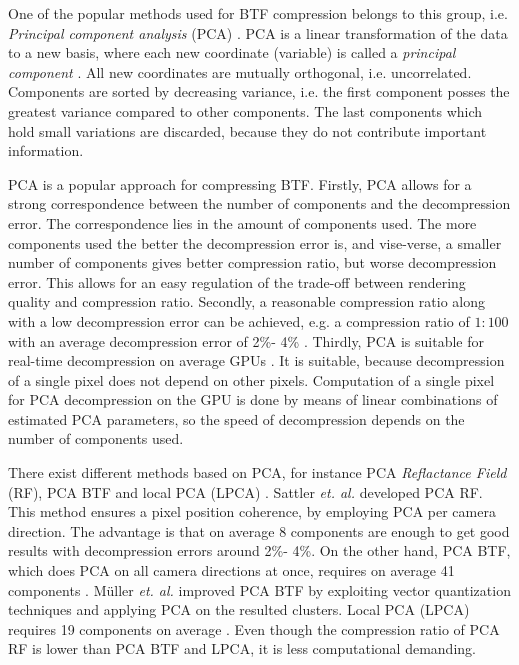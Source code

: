 One of the popular methods used for BTF compression belongs to this group, i.e. \emph{Principal component analysis} (PCA) \cite{Bishop,schneider2004,haindl,webglbtfstreaming,sattler-2003-efficient,mueller-2003-compression,gpu_gems}.
PCA is a linear transformation of the data to a new basis, where each new coordinate (variable) is called a \emph{principal component} \cite{Bishop}.
All new coordinates are mutually orthogonal, i.e. uncorrelated. Components are sorted by decreasing variance, i.e. the first component posses the greatest variance compared to other components. 
 The last components which hold small variations are discarded, because they do not contribute important information.

PCA is a popular approach for compressing BTF. 
Firstly, PCA allows for a strong correspondence between the number of components and the decompression error.
 The correspondence lies in the amount of components used.
 The more components used the better the decompression error is, and vise-verse, a smaller number of components gives better compression ratio, but worse decompression error.
 This allows for an easy  regulation of the trade-off between rendering quality and  compression ratio.
Secondly, a reasonable compression ratio along with a low decompression error can be achieved, e.g. a compression ratio of $1:100$ with an average decompression error of 2\%- 4\% \cite{schneider2004,haindl}.
Thirdly, PCA is suitable for real-time decompression on average GPUs \cite{schneider2004,haindl}. 
It is suitable, because decompression of a single pixel does not depend on other pixels.
 Computation of a single pixel for PCA decompression on the GPU is done by means of linear combinations of estimated PCA parameters, so the speed of decompression depends on the number of components used.
 
 There exist different methods based on PCA, for instance PCA \emph{Reflactance Field} (RF), PCA BTF and local PCA (LPCA) \cite{sattler-2003-efficient,schneider2004,mueller-2003-compression, haindl}.
 Sattler \emph{et. al.} \cite{sattler-2003-efficient} developed PCA RF. 
 This method ensures a pixel position coherence, by employing PCA per camera direction. 
 The advantage is that on average 8 components are enough to get good results with decompression errors around 2\%- 4\%.
 On the other hand, PCA BTF, which does PCA on all camera directions at once, requires on average 41 components \cite{haindl}.
 M{\"u}ller  \emph{et. al.} \cite{schneider2004} improved PCA BTF by exploiting vector quantization techniques and applying PCA on the resulted clusters.
Local PCA (LPCA) requires 19 components on average \cite{haindl}.
 Even though the compression ratio of PCA RF is lower than PCA BTF and LPCA, it is less computational demanding.


